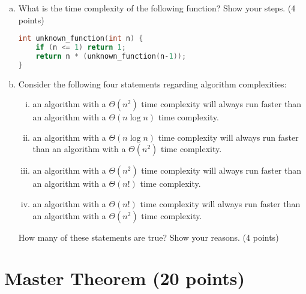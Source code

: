 \documentclass[11pt]{exam}
\begin{document}
\begin{enumerate}[(a)]
\item What is the time complexity of the following function? Show your steps. (4 points)
\begin{lstlisting}[language=c++]
int unknown_function(int n) {
	if (n <= 1) return 1;
	return n * (unknown_function(n-1));
}
\end{lstlisting}
\begin{solution}
\end{solution}

\item Consider the following four statements regarding algorithm complexities:
\begin{enumerate}[i)]
\item an algorithm with a $\Theta(n^2)$ time complexity will always run faster than an algorithm with a $\Theta(n \log n)$ time complexity.
\item an algorithm with a $\Theta(n \log n)$ time complexity will always run faster than an algorithm with a $\Theta(n^2)$ time complexity.
\item an algorithm with a $\Theta(n^2)$ time complexity will always run faster than an algorithm with a $\Theta(n!)$ time complexity.
\item an algorithm with a $\Theta(n!)$ time complexity will always run faster than an algorithm with a $\Theta(n^2)$ time complexity.
\end{enumerate}

How many of these statements are true? Show your reasons. (4 points)
\begin{solution}
\end{solution}

\end{enumerate}
\newpage
\section{Master Theorem (20 points)}
\end{document}
